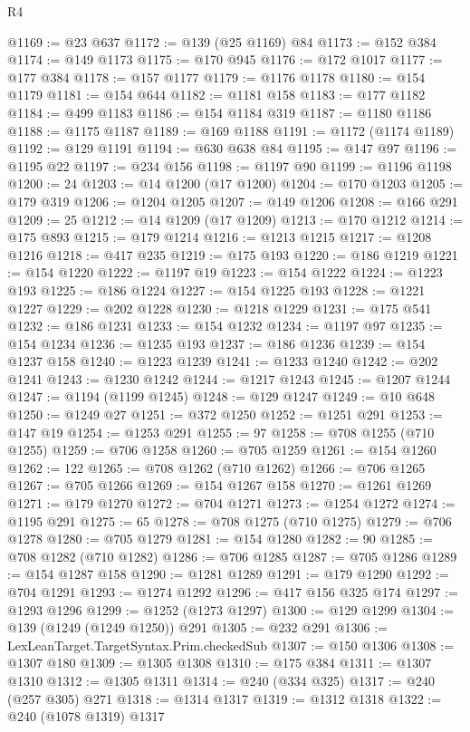\begin{lexlean}{R4}
\begin{coremodule}
@1169 := @23 @637
@1172 := @139 (@25 @1169) @84
@1173 := @152 @384
@1174 := @149 @1173
@1175 := @170 @945
@1176 := @172 @1017
@1177 := @177 @384
@1178 := @157 @1177
@1179 := @1176 @1178
@1180 := @154 @1179
@1181 := @154 @644
@1182 := @1181 @158
@1183 := @177 @1182
@1184 := @499 @1183
@1186 := @154 @1184 @319
@1187 := @1180 @1186
@1188 := @1175 @1187
@1189 := @169 @1188
@1191 := @1172 (@1174 @1189)
@1192 := @129 @1191
@1194 := @630 @638 @84
@1195 := @147 @97
@1196 := @1195 @22
@1197 := @234 @156
@1198 := @1197 @90
@1199 := @1196 @1198
@1200 := 24
@1203 := @14 @1200 (@17 @1200)
@1204 := @170 @1203
@1205 := @179 @319
@1206 := @1204 @1205
@1207 := @149 @1206
@1208 := @166 @291
@1209 := 25
@1212 := @14 @1209 (@17 @1209)
@1213 := @170 @1212
@1214 := @175 @893
@1215 := @179 @1214
@1216 := @1213 @1215
@1217 := @1208 @1216
@1218 := @417 @235
@1219 := @175 @193
@1220 := @186 @1219
@1221 := @154 @1220
@1222 := @1197 @19
@1223 := @154 @1222
@1224 := @1223 @193
@1225 := @186 @1224
@1227 := @154 @1225 @193
@1228 := @1221 @1227
@1229 := @202 @1228
@1230 := @1218 @1229
@1231 := @175 @541
@1232 := @186 @1231
@1233 := @154 @1232
@1234 := @1197 @97
@1235 := @154 @1234
@1236 := @1235 @193
@1237 := @186 @1236
@1239 := @154 @1237 @158
@1240 := @1223 @1239
@1241 := @1233 @1240
@1242 := @202 @1241
@1243 := @1230 @1242
@1244 := @1217 @1243
@1245 := @1207 @1244
@1247 := @1194 (@1199 @1245)
@1248 := @129 @1247
@1249 := @10 @648
@1250 := @1249 @27
@1251 := @372 @1250
@1252 := @1251 @291
@1253 := @147 @19
@1254 := @1253 @291
@1255 := 97
@1258 := @708 @1255 (@710 @1255)
@1259 := @706 @1258
@1260 := @705 @1259
@1261 := @154 @1260
@1262 := 122
@1265 := @708 @1262 (@710 @1262)
@1266 := @706 @1265
@1267 := @705 @1266
@1269 := @154 @1267 @158
@1270 := @1261 @1269
@1271 := @179 @1270
@1272 := @704 @1271
@1273 := @1254 @1272
@1274 := @1195 @291
@1275 := 65
@1278 := @708 @1275 (@710 @1275)
@1279 := @706 @1278
@1280 := @705 @1279
@1281 := @154 @1280
@1282 := 90
@1285 := @708 @1282 (@710 @1282)
@1286 := @706 @1285
@1287 := @705 @1286
@1289 := @154 @1287 @158
@1290 := @1281 @1289
@1291 := @179 @1290
@1292 := @704 @1291
@1293 := @1274 @1292
@1296 := @417 @156 @325 @174
@1297 := @1293 @1296
@1299 := @1252 (@1273 @1297)
@1300 := @129 @1299
@1304 := @139 (@1249 (@1249 @1250)) @291
@1305 := @232 @291
@1306 := LexLeanTarget.TargetSyntax.Prim.checkedSub
@1307 := @150 @1306
@1308 := @1307 @180
@1309 := @1305 @1308
@1310 := @175 @384
@1311 := @1307 @1310
@1312 := @1305 @1311
@1314 := @240 (@334 @325)
@1317 := @240 (@257 @305) @271
@1318 := @1314 @1317
@1319 := @1312 @1318
@1322 := @240 (@1078 @1319) @1317

\end{coremodule}
\end{lexlean}
